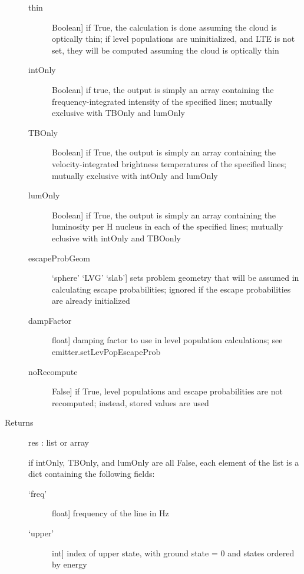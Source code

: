 \documentclass[letterpaper,10pt,english]{sphinxmanual}
\begin{document}
\begin{fulllineitems}
\begin{fulllineitems}
\begin{description}
\begin{description}
\item[{thin}] \leavevmode{[}Boolean{]}
if True, the calculation is done assuming the cloud is
optically thin; if level populations are uninitialized,
and LTE is not set, they will be computed assuming the
cloud is optically thin

\item[{intOnly}] \leavevmode{[}Boolean{]}
if true, the output is simply an array containing the
frequency-integrated intensity of the specified lines;
mutually exclusive with TBOnly and lumOnly

\item[{TBOnly}] \leavevmode{[}Boolean{]}
if True, the output is simply an array containing the
velocity-integrated brightness temperatures of the
specified lines; mutually exclusive with intOnly and
lumOnly

\item[{lumOnly}] \leavevmode{[}Boolean{]}
if True, the output is simply an array containing the
luminosity per H nucleus in each of the specified lines;
mutually eclusive with intOnly and TBOonly

\item[{escapeProbGeom}] \leavevmode{[}`sphere' \textbar{} `LVG' \textbar{} `slab'{]}
sets problem geometry that will be assumed in calculating
escape probabilities; ignored if the escape probabilities
are already initialized

\item[{dampFactor}] \leavevmode{[}float{]}
damping factor to use in level population calculations;
see emitter.setLevPopEscapeProb

\item[{noRecompute}] \leavevmode{[}False{]}
if True, level populations and escape probabilities are
not recomputed; instead, stored values are used

\end{description}

\item[{Returns}] \leavevmode
res : list or array

if intOnly, TBOnly, and lumOnly are all False, each element
of the list is a dict containing the following fields:
\begin{description}
\item[{`freq'}] \leavevmode{[}float{]}
frequency of the line in Hz

\item[{`upper'}] \leavevmode{[}int{]}
index of upper state, with ground state = 0 and states
ordered by energy


\end{description}
\end{description}
\end{fulllineitems}
\end{fulllineitems}
\end{document}
